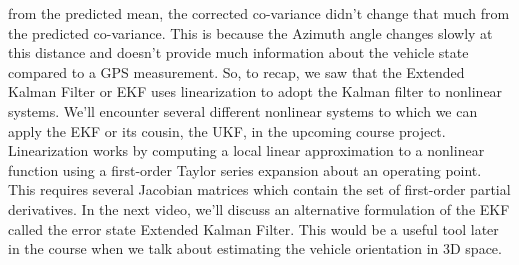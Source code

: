 from the predicted mean, the corrected co-variance didn't change that much from the predicted co-variance. This is because the Azimuth angle
changes slowly at this distance and doesn't provide
much information about the vehicle state compared
to a GPS measurement. So, to recap, we saw that
the Extended Kalman Filter or EKF uses linearization to adopt
the Kalman filter to nonlinear systems. We'll encounter several
different nonlinear systems to which we can apply
the EKF or its cousin, the UKF, in the upcoming course project. Linearization works by computing
a local linear approximation to a nonlinear function using a first-order Taylor series expansion
about an operating point. This requires several Jacobian matrices which contain the set of
first-order partial derivatives. In the next video, we'll discuss an
alternative formulation of the EKF called the error
state Extended Kalman Filter. This would be a useful tool later
in the course when we talk about estimating the vehicle
orientation in 3D space.
